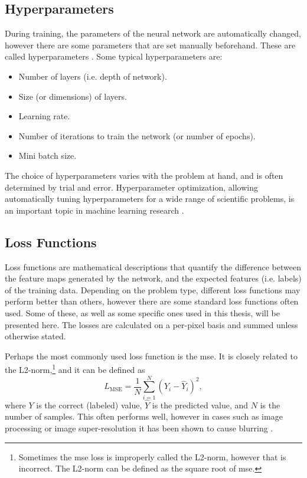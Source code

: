 \subsection{Hyperparameters}
During training, the parameters of the neural network are automatically changed, however there are some parameters that are set manually beforehand. These are called hyperparameters \cite{claesen2015hyperparameter}. Some typical hyperparameters are:
\begin{itemize}
    \item Number of layers (i.e. depth of network).
    \item Size (or dimensions) of layers.
    \item Learning rate.
    \item Number of iterations to train the network (or number of epochs).
    \item Mini batch size.
\end{itemize}

The choice of hyperparameters varies with the problem at hand, and is often determined by trial and error. Hyperparameter optimization, allowing automatically tuning hyperparameters for a wide range of scientific problems, is an important topic in machine learning research \cite{hyperparameteroptimizing}.

\subsection{Loss Functions}
\label{sec:ml:training:lossfunctions}
Loss functions are mathematical descriptions that quantify the difference between the feature maps generated by the network, and the expected features (i.e. labels) of the training data. Depending on the problem type, different loss functions may perform better than others, however there are some standard loss functions often used. Some of these, as well as some specific ones used in this thesis, will be presented here. The losses are calculated on a per-pixel basis and summed unless otherwise stated. 

Perhaps the most commonly used loss function is the \gls{mse}. It is closely related to the L2-norm,\footnote{Sometimes the \gls{mse} loss is improperly called the L2-norm, however that is incorrect. The L2-norm can be defined as the square root of \gls{mse}. } and it can be defined as
\begin{equation}
    \label{eq:lossmse}
    L_{\text{MSE}} = \frac{1}{N} \sum_{i=1}^N(Y_i - \hat{Y}_i)^2,
\end{equation}
where $Y$ is the correct (labeled) value,  $\hat{Y}$ is the predicted value, and $N$ is the number of samples. This often performs well, however in cases such as image processing or image super-resolution it has been shown to cause blurring \cite{7797130}.

